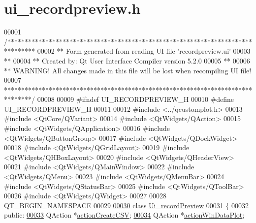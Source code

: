 \hypertarget{a00140_source}{\section{ui\+\_\+recordpreview.\+h}
\label{a00140_source}
}

\begin{DoxyCode}
00001 \textcolor{comment}{/********************************************************************************}
00002 \textcolor{comment}{** Form generated from reading UI file 'recordpreview.ui'}
00003 \textcolor{comment}{**}
00004 \textcolor{comment}{** Created by: Qt User Interface Compiler version 5.2.0}
00005 \textcolor{comment}{**}
00006 \textcolor{comment}{** WARNING! All changes made in this file will be lost when recompiling UI file!}
00007 \textcolor{comment}{********************************************************************************/}
00008 
00009 \textcolor{preprocessor}{#ifndef UI\_RECORDPREVIEW\_H}
00010 \textcolor{preprocessor}{#define UI\_RECORDPREVIEW\_H}
00011 
00012 \textcolor{preprocessor}{#include <../qcustomplot.h>}
00013 \textcolor{preprocessor}{#include <QtCore/QVariant>}
00014 \textcolor{preprocessor}{#include <QtWidgets/QAction>}
00015 \textcolor{preprocessor}{#include <QtWidgets/QApplication>}
00016 \textcolor{preprocessor}{#include <QtWidgets/QButtonGroup>}
00017 \textcolor{preprocessor}{#include <QtWidgets/QDockWidget>}
00018 \textcolor{preprocessor}{#include <QtWidgets/QGridLayout>}
00019 \textcolor{preprocessor}{#include <QtWidgets/QHBoxLayout>}
00020 \textcolor{preprocessor}{#include <QtWidgets/QHeaderView>}
00021 \textcolor{preprocessor}{#include <QtWidgets/QMainWindow>}
00022 \textcolor{preprocessor}{#include <QtWidgets/QMenu>}
00023 \textcolor{preprocessor}{#include <QtWidgets/QMenuBar>}
00024 \textcolor{preprocessor}{#include <QtWidgets/QStatusBar>}
00025 \textcolor{preprocessor}{#include <QtWidgets/QToolBar>}
00026 \textcolor{preprocessor}{#include <QtWidgets/QWidget>}
00027 
00028 QT\_BEGIN\_NAMESPACE
00029 
\hypertarget{a00140_source_l00030}{}\hyperlink{a00081}{00030} \textcolor{keyword}{class }\hyperlink{a00081}{Ui\_recordPreview}
00031 \{
00032 \textcolor{keyword}{public}:
\hypertarget{a00140_source_l00033}{}\hyperlink{a00081_ae81b7303db9e9c5d730c59b86ec0e960}{00033}     QAction *\hyperlink{a00081_ae81b7303db9e9c5d730c59b86ec0e960}{actionCreateCSV};
\hypertarget{a00140_source_l00034}{}\hyperlink{a00081_aa09067a9c96c9cd78f75261a9fcb89f0}{00034}     QAction *\hyperlink{a00081_aa09067a9c96c9cd78f75261a9fcb89f0}{actionWinDataPlot};

\end{DoxyCode}
